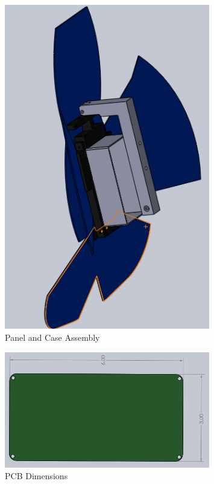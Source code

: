 \documentclass{article}
\numberwithin{figure}{section}
\numberwithin{equation}{section}
\begin{document}
{\begin{figure}[H]
	\centering
	\includegraphics[width=0.8\textwidth]{NewAssembly2}
	\caption{Panel and Case Assembly}
	\label{fig:append_panel_case_assembly}
\end{figure}

\begin{figure}[H]
	\centering
	\includegraphics[width=0.8\textwidth]{PCB}
	\caption{PCB Dimensions}
	\label{fig:append_pcbdimensions}
\end{figure}

}
\end{document}
